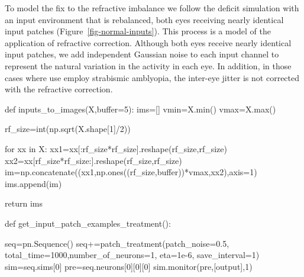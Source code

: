 \documentclass[
  letterpaper,
  number]{elsarticle}
\newenvironment{Shaded}{\begin{snugshade}}{\end{snugshade}}
\newcommand{\BuiltInTok}[1]{\textcolor[rgb]{0.00,0.23,0.31}{#1}}
\newcommand{\ControlFlowTok}[1]{\textcolor[rgb]{0.00,0.23,0.31}{#1}}
\newcommand{\DecValTok}[1]{\textcolor[rgb]{0.68,0.00,0.00}{#1}}
\newcommand{\FloatTok}[1]{\textcolor[rgb]{0.68,0.00,0.00}{#1}}
\newcommand{\KeywordTok}[1]{\textcolor[rgb]{0.00,0.23,0.31}{#1}}
\newcommand{\NormalTok}[1]{\textcolor[rgb]{0.00,0.23,0.31}{#1}}
\newcommand{\OperatorTok}[1]{\textcolor[rgb]{0.37,0.37,0.37}{#1}}
\newcommand{\StringTok}[1]{\textcolor[rgb]{0.13,0.47,0.30}{#1}}
\begin{document}
To model the fix to the refractive imbalance we follow the deficit
simulation with an input environment that is rebalanced, both eyes
receiving nearly identical input patches
(Figure~\ref{fig-normal-inputs}). This process is a model of the
application of refractive correction. Although both eyes receive nearly
identical input patches, we add independent Gaussian noise to each input
channel to represent the natural variation in the activity in each eye.
In addition, in those cases where use employ strabismic amblyopia, the
inter-eye jitter is not corrected with the refractive correction.

\begin{Shaded}
\begin{Highlighting}[]
\KeywordTok{def}\NormalTok{ inputs\_to\_images(X,}\BuiltInTok{buffer}\OperatorTok{=}\DecValTok{5}\NormalTok{):}
\NormalTok{    ims}\OperatorTok{=}\NormalTok{[]}
\NormalTok{    vmin}\OperatorTok{=}\NormalTok{X.}\BuiltInTok{min}\NormalTok{()}
\NormalTok{    vmax}\OperatorTok{=}\NormalTok{X.}\BuiltInTok{max}\NormalTok{()}
    
\NormalTok{    rf\_size}\OperatorTok{=}\BuiltInTok{int}\NormalTok{(np.sqrt(X.shape[}\DecValTok{1}\NormalTok{]}\OperatorTok{/}\DecValTok{2}\NormalTok{))}
    
    \ControlFlowTok{for}\NormalTok{ xx }\KeywordTok{in}\NormalTok{ X:}
\NormalTok{        xx1}\OperatorTok{=}\NormalTok{xx[:rf\_size}\OperatorTok{*}\NormalTok{rf\_size].reshape(rf\_size,rf\_size)}
\NormalTok{        xx2}\OperatorTok{=}\NormalTok{xx[rf\_size}\OperatorTok{*}\NormalTok{rf\_size:].reshape(rf\_size,rf\_size)}
\NormalTok{        im}\OperatorTok{=}\NormalTok{np.concatenate((xx1,np.ones((rf\_size,}\BuiltInTok{buffer}\NormalTok{))}\OperatorTok{*}\NormalTok{vmax,xx2),axis}\OperatorTok{=}\DecValTok{1}\NormalTok{)   }
\NormalTok{        ims.append(im)}
        
    \ControlFlowTok{return}\NormalTok{ ims}

\KeywordTok{def}\NormalTok{ get\_input\_patch\_examples\_treatment():}
    
\NormalTok{    seq}\OperatorTok{=}\NormalTok{pn.Sequence()    }
\NormalTok{    seq}\OperatorTok{+=}\NormalTok{patch\_treatment(patch\_noise}\OperatorTok{=}\FloatTok{0.5}\NormalTok{,}
\NormalTok{               total\_time}\OperatorTok{=}\DecValTok{1000}\NormalTok{,number\_of\_neurons}\OperatorTok{=}\DecValTok{1}\NormalTok{,}
\NormalTok{               eta}\OperatorTok{=}\FloatTok{1e{-}6}\NormalTok{,}
\NormalTok{               save\_interval}\OperatorTok{=}\DecValTok{1}\NormalTok{)}
\NormalTok{    sim}\OperatorTok{=}\NormalTok{seq.sims[}\DecValTok{0}\NormalTok{]}
\NormalTok{    pre}\OperatorTok{=}\NormalTok{seq.neurons[}\DecValTok{0}\NormalTok{][}\DecValTok{0}\NormalTok{][}\DecValTok{0}\NormalTok{]}
\NormalTok{    sim.monitor(pre,[}\StringTok{\textquotesingle{}output\textquotesingle{}}\NormalTok{],}\DecValTok{1}\NormalTok{)}


\end{Highlighting}
\end{Shaded}
\end{document}

